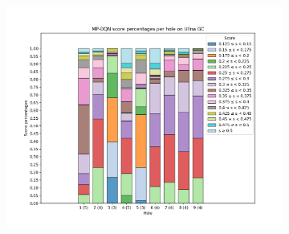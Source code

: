\documentclass{kththesis}
\begin{document}
\begin{figure}
{\begin{subfigure}{0.3\paperwidth}
    \end{subfigure}
    \begin{subfigure}{0.3\paperwidth}
    \centering
    \includegraphics[width=0.3\paperwidth]{AgentPercentages/MPDQN_Score_Percentages_Ullna.png} 
    \end{subfigure}
    }
\end{figure}
\end{document}

